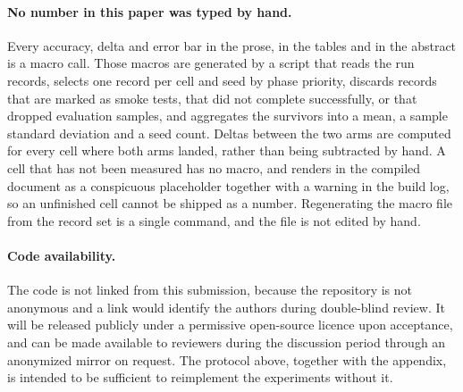 \paragraph{No number in this paper was typed by hand.}
Every accuracy, delta and error bar in the prose, in the tables and in the
abstract is a macro call. Those macros are generated by a script that reads the
run records, selects one record per cell and seed by phase priority, discards
records that are marked as smoke tests, that did not complete successfully, or
that dropped evaluation samples, and aggregates the survivors into a mean, a
sample standard deviation and a seed count. Deltas between the two arms are
computed for every cell where both arms landed, rather than being subtracted by
hand. A cell that has not been measured has no macro, and renders in the
compiled document as a conspicuous placeholder together with a warning in the
build log, so an unfinished cell cannot be shipped as a number. Regenerating the
macro file from the record set is a single command, and the file is not edited
by hand.

\paragraph{Code availability.}
The code is not linked from this submission, because the repository is not
anonymous and a link would identify the authors during double-blind review. It
will be released publicly under a permissive open-source licence upon
acceptance, and can be made available to reviewers during the discussion period
through an anonymized mirror on request. The protocol above, together with the
appendix, is intended to be sufficient to reimplement the experiments without
it.
